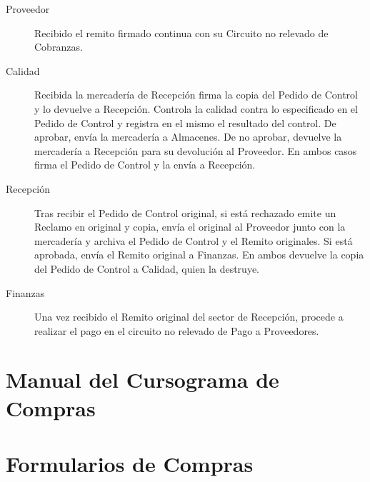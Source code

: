 \begin{description}
\item [Proveedor] Recibido el remito firmado continua con su Circuito no relevado de Cobranzas.
\item [Calidad] Recibida la mercadería de Recepción firma la copia del Pedido de Control y lo devuelve a Recepción. Controla la calidad contra lo especificado en el Pedido de Control y registra en el mismo el resultado del control. De aprobar, envía la mercadería a Almacenes. De no aprobar, devuelve la mercadería a Recepción para su devolución al Proveedor. En ambos casos firma el Pedido de Control y la envía a Recepción.
\item [Recepción] Tras recibir el Pedido de Control original, si está rechazado emite un Reclamo en original y copia, envía el original al Proveedor junto con la mercadería y archiva el Pedido de Control y el Remito originales. Si está aprobada, envía el Remito original a Finanzas. En ambos devuelve la copia del Pedido de Control a Calidad, quien la destruye.
\item [Finanzas] Una vez recibido el Remito original del sector de Recepción, procede a realizar el pago en el circuito no relevado de Pago a Proveedores.

\end{description}

\pagebreak
\section{Manual del Cursograma de Compras}

\pagebreak
\section{Formularios de Compras}
